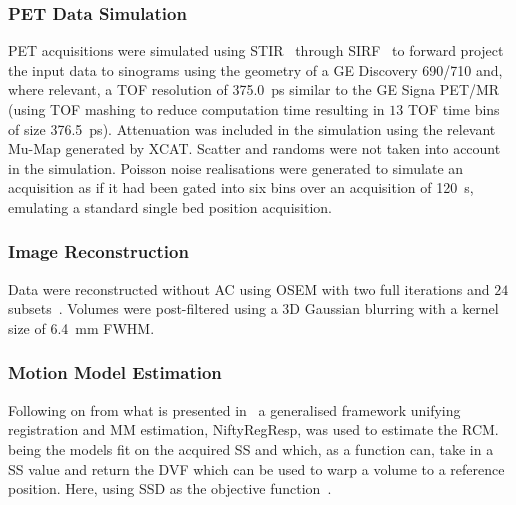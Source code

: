             \subsubsection{PET Data Simulation} \label{sec:impact_of_tof_on_respiratory_motion_model_estimation_using_pre_gated_no_intra_cycle_motion_nac_pet_methods_pet_data_simulation}
                \gls{PET} acquisitions were simulated using \gls{STIR}~\parencite{Thielemans2012} through \gls{SIRF}~\parencite{Ovtchinnikov2017} to forward project the input data to sinograms using the geometry of a \gls{GE} Discovery 690/710 and, where relevant, a \gls{TOF} resolution of \SI{375.0}{\pico\second} similar to the \gls{GE} Signa \gls{PET}/\gls{MR} (using \gls{TOF} mashing to reduce computation time resulting in $13$ \gls{TOF} time bins of size \SI{376.5}{\pico\second}). Attenuation was included in the simulation using the relevant \gls{Mu-Map} generated by \gls{XCAT}. Scatter and randoms were not taken into account in the simulation. Poisson noise realisations were generated to simulate an acquisition as if it had been gated into six bins over an acquisition of \SI{120}{\second}, emulating a standard single bed position acquisition. 
            
            \subsubsection{Image Reconstruction} \label{sec:impact_of_tof_on_respiratory_motion_model_estimation_using_pre_gated_no_intra_cycle_motion_nac_pet_methods_image_reconstruction}
                Data were reconstructed without \gls{AC} using \gls{OSEM} with two full iterations and $24$ subsets~\parencite{Hudson1994}. Volumes were post-filtered using a \gls{3D} Gaussian blurring with a kernel size of \SI{6.4}{\milli\metre} \gls{FWHM}.
            
            \subsubsection{Motion Model Estimation} \label{sec:impact_of_tof_on_respiratory_motion_model_estimation_using_pre_gated_no_intra_cycle_motion_nac_pet_methods_motion_model_estimation}
                Following on from what is presented in~ a generalised framework unifying registration and \gls{MM} estimation, NiftyRegResp, was used to estimate the \gls{RCM}.  being the models fit on the acquired \gls{SS} and  which, as a function can, take in a \gls{SS} value and return the \gls{DVF} which can be used to warp a volume to a reference position. Here, using \gls{SSD} as the objective function~\parencite{McClelland2017}.
                

